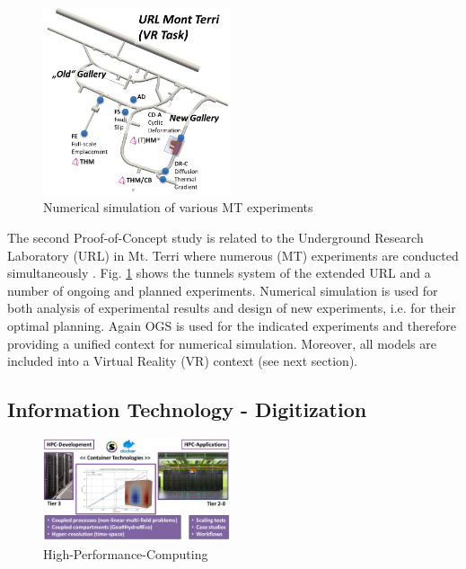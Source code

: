 \begin{figure}
\vspace{-5mm}
\centering
\includegraphics[width=0.49\textwidth]{figures/mt-vr-01a}
\caption{Numerical simulation of various MT experiments \cite{Rink20143857}}
\label{fig:mt-terri}
\end{figure}
The second Proof-of-Concept study is related to the Underground Research Laboratory (URL) in Mt. Terri where numerous (MT) experiments are conducted simultaneously \cite{Bossart2017405,Bossart20173}. Fig. \ref{fig:mt-terri} shows the tunnels system of the extended URL and a number of ongoing and planned experiments. Numerical simulation is used for both analysis of experimental results and design of new experiments, i.e. for their optimal planning. Again OGS is used for the indicated experiments and therefore providing a unified context for numerical simulation. Moreover, all models are included into a Virtual Reality (VR) context (see next section).

\subsection*{Information Technology - Digitization}

\begin{figure}
\vspace{-5mm}
\centering
\includegraphics[width=0.49\textwidth]{figures/hpc-concept1}
\caption{High-Performance-Computing}
\label{fig:workflows}
\end{figure}
\lipsum[2]

